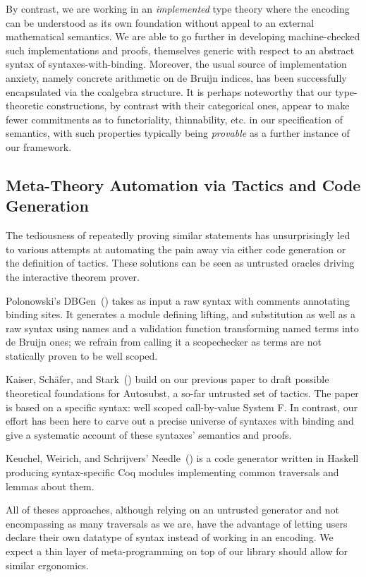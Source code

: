 By contrast, we are working in an \emph{implemented} type theory where the
encoding can be understood as its own foundation without appeal to an external
mathematical semantics. We are able to go further in developing machine-checked
such implementations and proofs, themselves generic with respect to an abstract syntax
 of syntaxes-with-binding. Moreover, the usual source of implementation
anxiety, namely concrete arithmetic on de Bruijn indices, has been successfully
encapsulated via the  coalgebra structure. It is perhaps noteworthy that
our type-theoretic constructions, by contrast with their categorical ones,
appear to make fewer commitments as to functoriality, thinnability, etc. in our
specification of semantics, with such properties typically being \emph{provable}
as a further instance of our framework.

\subsection{Meta-Theory Automation via Tactics and Code Generation} The
tediousness of repeatedly
proving similar statements has unsurprisingly led to various attempts at
automating the pain away via either code generation or the definition of
tactics. These solutions can be seen as untrusted oracles driving the
interactive theorem prover.

Polonowski's DBGen~(\citeyear{polonowski:db}) takes as input a raw syntax with
comments annotating binding sites. It generates a module defining lifting,
and substitution as well as a raw syntax using names and a validation function
transforming named terms into de Bruijn ones; we refrain from calling it a
scopechecker as terms are not statically proven to be well scoped.


Kaiser, Schäfer, and Stark~(\citeyear{Kaiser-wsdebr}) build on our previous paper
to draft possible theoretical foundations for Autosubst, a so-far untrusted
set of tactics. The paper is based on a specific syntax: well scoped call-by-value
System F. In contrast, our effort has been here to carve out
a precise universe of syntaxes with binding and give a systematic account
of these syntaxes' semantics and proofs.

Keuchel, Weirich, and Schrijvers' Needle~(\citeyear{needleandknot}) is a code
generator written in Haskell producing syntax-specific Coq modules
implementing common traversals and lemmas about them.

All of theses approaches, although relying on an untrusted generator and
not encompassing as many traversals as we are, have the advantage of letting
users declare their own datatype of syntax instead of working in an encoding.
%
We expect a thin layer of meta-programming on top of our library should allow for
similar ergonomics.


